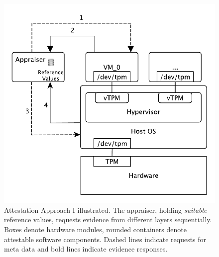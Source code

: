 \begin{figure}[!ht]
  \centering
    \includegraphics[scale=0.35]{figures/type1attest.pdf}
  \caption{Attestation Approach I illustrated. The appraiser, holding \emph{suitable} reference values, requests evidence from different layers sequentially. Boxes denote hardware modules, rounded containers denote attestable software components. Dashed lines indicate requests for meta data and bold lines indicate evidence responses.}
  \label{fig:type1attest}
\end{figure}
